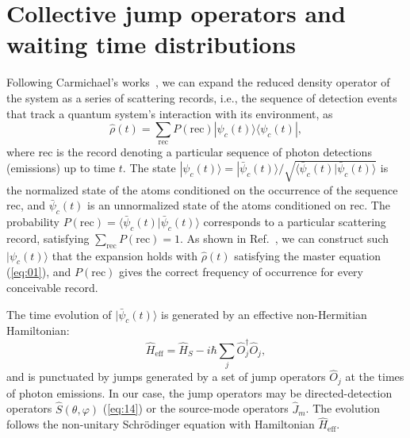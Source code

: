 \documentclass[aps,prl,twocolumn,superscriptaddress,showpacs,amsmath,amssymb]{revtex4-2}
\begin{document}
%

\section{Collective jump operators and waiting time distributions}

Following Carmichael's works~\cite{carmichael2009statistical,carmichael2000quantum,clemens2003collective}, we can expand the reduced density operator of the system as a series of scattering records, i.e., the sequence of detection events that track a quantum system's interaction with its environment, as
\[
\hat{\rho}(t) = \sum_{\mathrm{rec}} P(\mathrm{rec}) | \psi_c (t) \rangle \langle  \psi_c (t) |,
\]
where $\mathrm{rec}$ is the record denoting a particular sequence of photon detections (emissions) up to time $ t $. The state $ | \psi_c(t) \rangle = | \bar{\psi}_c(t) \rangle / \sqrt{\langle \bar{\psi}_c(t) | \bar{\psi}_c(t) \rangle} $ is the normalized state of the atoms conditioned on the occurrence of the sequence $ \mathrm{rec} $, and $ \bar{\psi}_c(t) $ is an unnormalized state of the atoms conditioned on $ \mathrm{rec} $. The probability $ P(\mathrm{rec}) = \langle \bar{\psi}_c(t) | \bar{\psi}_c(t) \rangle $ corresponds to a particular scattering record, satisfying $ \sum_\mathrm{rec} P(\mathrm{rec}) = 1 $. As shown in Ref.~\cite{carmichael2000quantum}, we can construct such $ | \psi_c(t) \rangle $ that the expansion holds with $ \hat{\rho}(t) $ satisfying the master equation (\ref{eq:01}), and $ P(\mathrm{rec}) $ gives the correct frequency of occurrence for every conceivable record.

The time evolution of $ | \bar{\psi}_c(t) \rangle $ is generated by an effective non-Hermitian Hamiltonian:
\begin{equation}
    \hat{H}_\mathrm{eff} = \hat{H}_S - i \hbar \sum_j \hat{O}_j^\dagger \hat{O}_j,
\end{equation}
and is punctuated by jumps generated by a set of jump operators $ \hat{O}_j $ at the times of photon emissions. In our case, the jump operators may be directed-detection operators $ \hat{S}(\theta, \varphi) $ (\ref{eq:14}) or the source-mode operators $ \hat{J}_m $. The evolution follows the non-unitary Schrödinger equation with Hamiltonian $ \hat{H}_\mathrm{eff} $.
\end{document}
